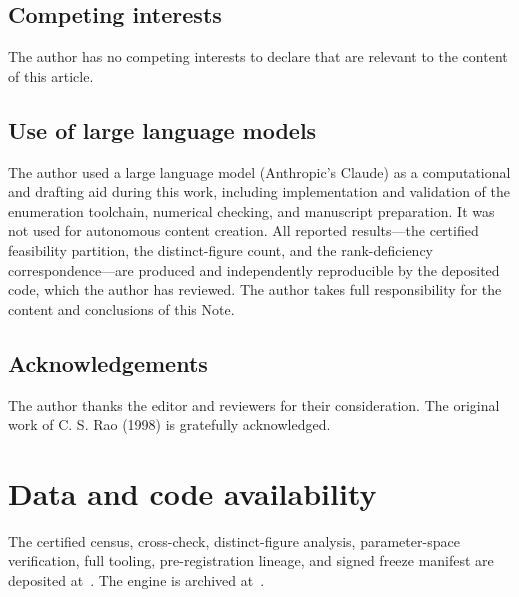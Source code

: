 \documentclass[11pt]{article}
\begin{document}
\subsection*{Competing interests}
The author has no competing interests to declare that are relevant to the content of this article.

\subsection*{Use of large language models}
The author used a large language model (Anthropic's Claude) as a computational and drafting aid during this work, including implementation and validation of the enumeration toolchain, numerical checking, and manuscript preparation. It was not used for autonomous content creation. All reported results---the certified feasibility partition, the distinct-figure count, and the rank-deficiency correspondence---are produced and independently reproducible by the deposited code, which the author has reviewed. The author takes full responsibility for the content and conclusions of this Note.

\subsection*{Acknowledgements}
The author thanks the editor and reviewers for their consideration. The original work of C. S. Rao (1998) is gratefully acknowledged.

\section*{Data and code availability}
The certified census, cross-check, distinct-figure analysis, parameter-space verification, full tooling, pre-registration lineage, and signed freeze manifest are deposited at~\cite{Dataset}. The engine is archived at~\cite{Engine}.
\end{document}
